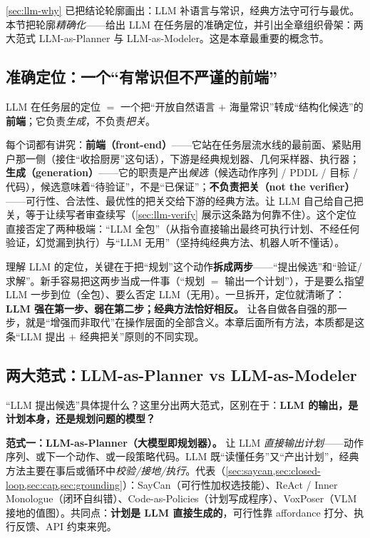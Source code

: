 \cref{sec:llm-why} 已把结论轮廓画出：LLM 补语言与常识，经典方法守可行与最优。本节把轮廓\emph{精确化}——给出 LLM 在任务层的准确定位，并引出全章组织骨架：两大范式 LLM-as-Planner 与 LLM-as-Modeler。这是本章最重要的概念节。

\subsection{准确定位：一个“有常识但不严谨的前端”}
\label{sec:llm-position-def}

\begin{definition}
\label{def:llm-position}
LLM 在任务层的定位 $=$ 一个把“开放自然语言 $+$ 海量常识”转成“结构化候选”的\textbf{前端}；它负责\emph{生成}，不负责\emph{把关}。
\end{definition}

\noindent 每个词都有讲究：\textbf{前端（front-end）}——它站在任务层流水线的最前面、紧贴用户那一侧（接住“收拾厨房”这句话），下游是经典规划器、几何采样器、执行器；\textbf{生成（generation）}——它的职责是产出\emph{候选}（候选动作序列 / PDDL / 目标 / 代码），候选意味着“待验证”，不是“已保证”；\textbf{不负责把关（not the verifier）}——可行性、合法性、最优性的把关交给下游的经典方法。让 LLM 自己给自己把关，等于让续写者审查续写（\cref{sec:llm-verify} 展示这条路为何靠不住）。这个定位直接否定了两种极端：“LLM 全包”（从指令直接输出最终可执行计划、不经任何验证，幻觉漏到执行）与“LLM 无用”（坚持纯经典方法、机器人听不懂话）。

\begin{insight}
理解 LLM 的定位，关键在于把“规划”这个动作\textbf{拆成两步}——“提出候选”和“验证/求解”。新手容易把这两步当成一件事（“规划 $=$ 输出一个计划”），于是要么指望 LLM 一步到位（全包）、要么否定 LLM（无用）。一旦拆开，定位就清晰了：\textbf{LLM 强在第一步、弱在第二步；经典方法恰好相反。} 让各自做各自强的那一步，就是“增强而非取代”在操作层面的全部含义。本章后面所有方法，本质都是这条“LLM 提出 $+$ 经典把关”原则的不同实现。
\end{insight}

\subsection{两大范式：LLM-as-Planner vs LLM-as-Modeler}
\label{sec:two-paradigms}

“LLM 提出候选”具体提什么？这里分出两大范式，区别在于：\textbf{LLM 的输出，是计划本身，还是规划问题的模型？}

\textbf{范式一：LLM-as-Planner（大模型即规划器）。} 让 LLM \emph{直接输出计划}——动作序列、或下一个动作、或一段策略代码。LLM 既“读懂任务”又“产出计划”，经典方法主要在事后或循环中\emph{校验/接地/执行}。代表（\cref{sec:saycan,sec:closed-loop,sec:cap,sec:grounding}）：SayCan（可行性加权选技能）、ReAct / Inner Monologue（闭环自纠错）、Code-as-Policies（计划写成程序）、VoxPoser（VLM 接地的值图）。共同点：\textbf{计划是 LLM 直接生成的}，可行性靠 affordance 打分、执行反馈、API 约束来兜。

